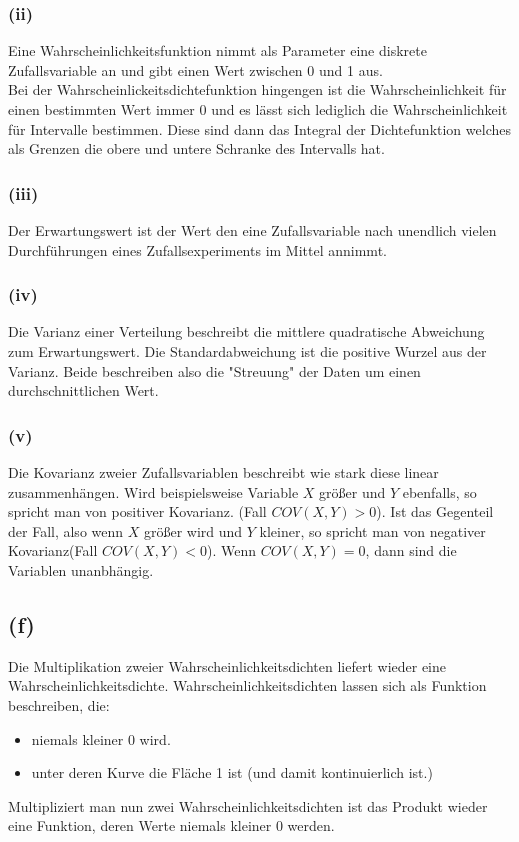 \documentclass[a4paper]{scrartcl}
\begin{document}
\subsubsection*{(ii)}
Eine Wahrscheinlichkeitsfunktion nimmt als Parameter eine diskrete Zufallsvariable an und gibt einen Wert zwischen 0 und 1 aus.\\
Bei der Wahrscheinlickeitsdichtefunktion hingengen ist die Wahrscheinlichkeit für einen bestimmten Wert immer 0 und es lässt sich lediglich die Wahrscheinlichkeit für Intervalle bestimmen. Diese sind dann das Integral der Dichtefunktion welches als Grenzen die obere und untere Schranke des Intervalls hat.

\subsubsection*{(iii)} 
Der Erwartungswert ist der Wert den eine Zufallsvariable nach unendlich vielen Durchführungen eines Zufallsexperiments im Mittel annimmt.

\subsubsection*{(iv)} 
Die Varianz einer Verteilung beschreibt die mittlere quadratische Abweichung zum Erwartungswert. Die Standardabweichung ist die positive Wurzel aus der Varianz. Beide beschreiben also die "Streuung" der Daten um einen durchschnittlichen Wert.

\subsubsection*{(v)} %
Die Kovarianz zweier Zufallsvariablen beschreibt wie stark diese linear zusammenhängen. Wird beispielsweise Variable $X$ größer und $Y$ ebenfalls, so spricht man von positiver Kovarianz. (Fall $COV(X,Y)> 0$). Ist das Gegenteil der Fall, also wenn $X$ größer wird und $Y$ kleiner, so spricht man von negativer Kovarianz(Fall $COV(X,Y) < 0$). Wenn $COV(X,Y)=0$, dann sind die Variablen unanbhängig.



\subsection*{(f)}
Die Multiplikation zweier Wahrscheinlichkeitsdichten liefert wieder eine Wahrscheinlichkeitsdichte. Wahrscheinlichkeitsdichten lassen sich als Funktion beschreiben, die:
\begin{itemize}
	\item niemals kleiner 0 wird.
	\item unter deren Kurve die Fläche 1 ist (und damit kontinuierlich ist.)
\end{itemize}
Multipliziert man nun zwei Wahrscheinlichkeitsdichten ist das Produkt wieder eine Funktion, deren Werte niemals kleiner 0 werden. 
\end{document}
